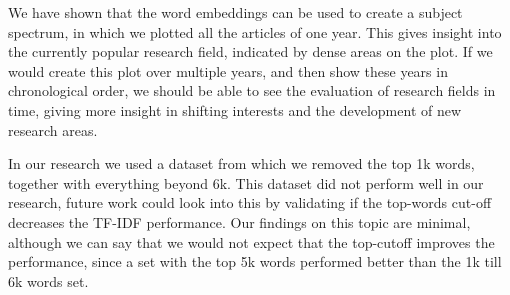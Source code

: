 \documentclass[../../Thesis.tex]{subfiles}
\begin{document}
We have shown that the word embeddings can be used to create a subject spectrum, in which we plotted all the articles of one year. This gives insight into the currently popular research field, indicated by dense areas on the plot. If we would create this plot over multiple years, and then show these years in chronological order, we should be able to see the evaluation of research fields in time, giving more insight in shifting interests and the development of new research areas.

In our research we used a dataset from which we removed the top 1k words, together with everything beyond 6k. This dataset did not perform well in our research, future work could look into this by validating if the top-words cut-off decreases the TF-IDF performance. Our findings on this topic are minimal, although we can say that we would not expect that the top-cutoff improves the performance, since a set with the top 5k words performed better than the 1k till 6k words set.
\end{document}
